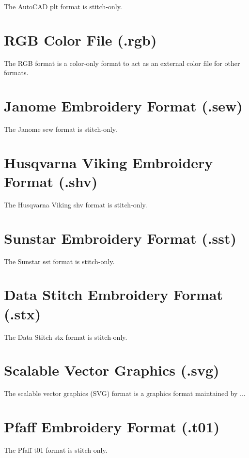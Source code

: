 \documentclass{report}
\begin{document}
The AutoCAD plt format is stitch-only.

\section{RGB Color File (.rgb)}

The RGB format is a color-only format to act as an external color file for other formats.

\section{Janome Embroidery Format (.sew)}

The Janome sew format is stitch-only.

\section{Husqvarna Viking Embroidery Format (.shv)}

The Husqvarna Viking shv format is stitch-only.

\section{Sunstar Embroidery Format (.sst)}

The Sunstar sst format is stitch-only.

\section{Data Stitch Embroidery Format (.stx)}

The Data Stitch stx format is stitch-only.

\section{Scalable Vector Graphics (.svg)}

The scalable vector graphics (SVG) format is a graphics format
maintained by ...

\section{Pfaff Embroidery Format (.t01)}

The Pfaff t01 format is stitch-only.
\end{document}
